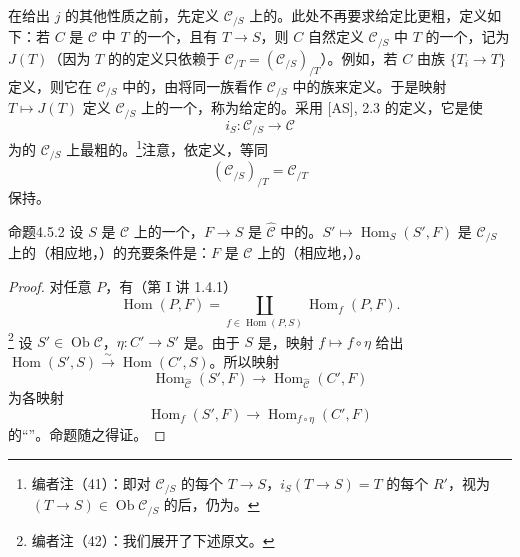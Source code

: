 在给出 $j$ 的其他性质之前，先定义 $\mathcal C_{/S}$ 上的。此处不再要求给定比更粗，定义如下：若 $C$ 是 $\mathcal C$ 中 $T$ 的一个，且有 $T\to S$，则 $C$ 自然定义 $\mathcal C_{/S}$ 中 $T$ 的一个，记为 $J(T)$（因为 $T$ 的的定义只依赖于 $\mathcal C_{/T}=(\mathcal C_{/S})_{/T}$）。例如，若 $C$ 由族 $\{T_i\to T\}$ 定义，则它在 $\mathcal C_{/S}$ 中的，由将同一族看作 $\mathcal C_{/S}$ 中的族来定义。于是映射 $T\mapsto J(T)$ 定义 $\mathcal C_{/S}$ 上的一个，称为给定的。采用 [AS], 2.3 的定义，它是使
\[
i_S:\mathcal C_{/S}\longrightarrow\mathcal C
\]
为的 $\mathcal C_{/S}$ 上最粗的。\footnote{编者注（41）：即对 $\mathcal C_{/S}$ 的每个 $T\to S$，$i_S(T\to S)=T$ 的每个 $R'$，视为 $(T\to S)\in\operatorname{Ob}\mathcal C_{/S}$ 的后，仍为。}注意，依定义，等同
\[
(\mathcal C_{/S})_{/T}=\mathcal C_{/T}
\]
保持。
\begin{SGAresult}{命题}{4.5.2}
设 $S$ 是 $\mathcal C$ 上的一个，$F\to S$ 是 $\widehat{\mathcal C}$ 中的。$S'\mapsto\operatorname{Hom}_S(S',F)$ 是 $\mathcal C_{/S}$ 上的（相应地，）的充要条件是：$F$ 是 $\mathcal C$ 上的（相应地，）。
\end{SGAresult}
\begin{proof}
对任意 $P$，有（第 I 讲 1.4.1）
\[
\operatorname{Hom}(P,F)=\coprod_{f\in\operatorname{Hom}(P,S)}\operatorname{Hom}_f(P,F).
\]
\footnote{编者注（42）：我们展开了下述原文。}
设 $S'\in\operatorname{Ob}\mathcal C$，$\eta:C'\to S'$ 是。由于 $S$ 是，映射 $f\mapsto f\circ\eta$ 给出 $\operatorname{Hom}(S',S)\xrightarrow{\sim}\operatorname{Hom}(C',S)$。所以映射
\[
\operatorname{Hom}_{\widehat{\mathcal C}}(S',F)\longrightarrow\operatorname{Hom}_{\widehat{\mathcal C}}(C',F)
\]
为各映射
\[
\operatorname{Hom}_f(S',F)\longrightarrow\operatorname{Hom}_{f\circ\eta}(C',F)
\]
的“”。命题随之得证。
\end{proof}
